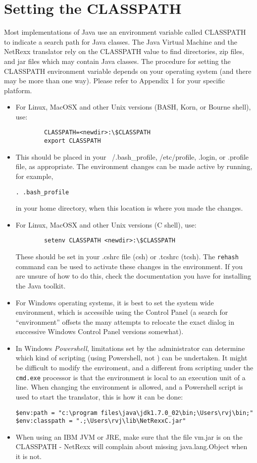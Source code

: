 \section{Setting the CLASSPATH}\label{install_classpath}
Most implementations of Java use an environment variable called CLASSPATH to indicate a search path for Java classes. The Java Virtual Machine and the NetRexx translator rely on the CLASSPATH value to find directories, zip files, and jar files which may contain Java classes. 
The procedure for setting the CLASSPATH environment variable depends on your operating system (and there may be more than one way). Please refer to Appendix 1 for your specific platform.
\begin{itemize}
\item For Linux, MacOSX and other Unix versions (BASH, Korn, or Bourne shell), use:
\begin{verbatim}
        CLASSPATH=<newdir>:\$CLASSPATH 
        export CLASSPATH
\end{verbatim}

\item This should be placed
  in your ~/.bash\_profile, /etc/profile, .login, or .profile file, as
  appropriate. The environment changes can be made active by running,
  for example,
\begin{verbatim}
. .bash_profile
\end{verbatim}
in your home directory, when this location is where you made the changes.
\item For Linux, MacOSX and other Unix versions (C shell), use:
\begin{verbatim}
        setenv CLASSPATH <newdir>:\$CLASSPATH 
\end{verbatim}
These should be set in your .cshrc file (csh) or .tcshrc (tcsh). The
\texttt{rehash} command can be used to activate these changes in the environment. If you are unsure of how to do this, check the
documentation you have for installing the Java toolkit.
\item For Windows operating systems, it is best to set the system wide
  environment, which is accessible using the Control Panel (a search
  for ``environment'' offsets the many attempts to relocate the exact
  dialog in successive Windows Control Panel versions somewhat).
\item In Windows \emph{Powershell}, limitations set by the
  administrator can determine which kind of scripting (using
  Powershell, not \nr) can be undertaken. It might be difficult to
  modify the enviroment, and a different from scripting under the
  \texttt{cmd.exe} processor is that the environment is local to an
  execution unit of a line. When changing the environment is allowed,
  and a Powershell script is used to start the \nr translator, this is
  how it can be done:
\begin{verbatim}
$env:path = "c:\program files\java\jdk1.7.0_02\bin;\Users\rvj\bin;"
$env:classpath = ".;\Users\rvj\lib\NetRexxC.jar"
\end{verbatim}
 \item When using an IBM JVM or JRE, make sure that the file vm.jar is
   on the CLASSPATH - NetRexx will complain about missing
   java.lang.Object when it is not.
\end{itemize}

